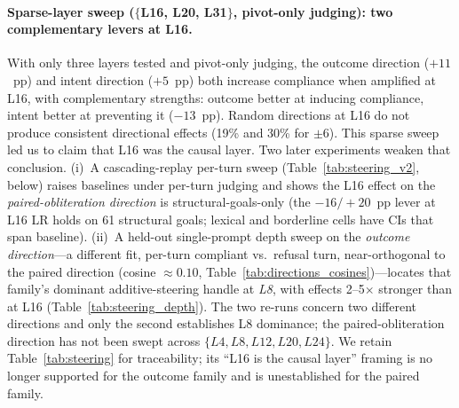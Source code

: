 \documentclass[11pt]{article}
\begin{document}
\paragraph{Sparse-layer sweep ($\{$L16, L20, L31$\}$, pivot-only judging): two complementary levers at L16.}
With only three layers tested and pivot-only judging, the outcome direction ($+11$~pp) and intent direction ($+5$~pp) both increase compliance when amplified at L16, with complementary strengths: outcome better at inducing compliance, intent better at preventing it ($-13$~pp).
Random directions at L16 do not produce consistent directional effects (19\% and 30\% for $\pm6$).
This sparse sweep led us to claim that L16 was the causal layer.
Two later experiments weaken that conclusion. (i)~A cascading-replay per-turn sweep (Table~\ref{tab:steering_v2}, below) raises baselines under per-turn judging and shows the L16 effect on the \emph{paired-obliteration direction} is structural-goals-only (the $-16/+20$~pp lever at L16 LR holds on 61 structural goals; lexical and borderline cells have CIs that span baseline). (ii)~A held-out single-prompt depth sweep on the \emph{outcome direction}---a different fit, per-turn compliant vs.\ refusal turn, near-orthogonal to the paired direction (cosine $\approx 0.10$, Table~\ref{tab:directions_cosines})---locates that family's dominant additive-steering handle at \emph{L8}, with effects 2--5$\times$ stronger than at L16 (Table~\ref{tab:steering_depth}). The two re-runs concern two different directions and only the second establishes L8 dominance; the paired-obliteration direction has not been swept across $\{L4, L8, L12, L20, L24\}$. We retain Table~\ref{tab:steering} for traceability; its ``L16 is the causal layer'' framing is no longer supported for the outcome family and is unestablished for the paired family.


\end{document}
